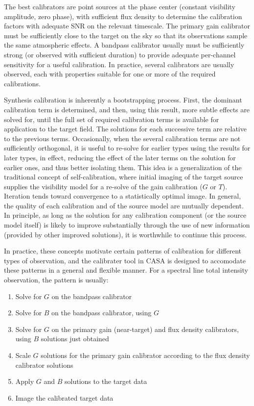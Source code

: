 The best calibrators are point sources at the phase center (constant
visibility amplitude, zero phase), with sufficient flux density to
determine the calibration factors with adequate SNR on the relevant
timescale. The primary gain calibrator must be sufficiently close to
the target on the sky so that its observations sample the same
atmospheric effects. A bandpass calibrator usually must be
sufficiently strong (or observed with sufficient duration) to provide
adequate per-channel sensitivity for a useful calibration. In
practice, several calibrators are usually observed, each with
properties suitable for one or more of the required calibrations. 

Synthesis calibration is inherently a bootstrapping process. First,
the dominant calibration term is determined, and then, using this
result, more subtle effects are solved for, until the full set of
required calibration terms is available for application to the target
field. The solutions for each successive term are relative to the
previous terms. Occasionally, when the several calibration terms are
not sufficiently orthogonal, it is useful to re-solve for earlier
types using the results for later types, in effect, reducing the
effect of the later terms on the solution for earlier ones, and thus
better isolating them. This idea is a generalization of the
traditional concept of self-calibration, where initial imaging of the
target source supplies the visibility model for a re-solve of the gain
calibration ($G$ or $T$). Iteration tends toward convergence to a
statistically optimal image. In general, the quality of each
calibration and of the source model are mutually dependent. In
principle, as long as the solution for any calibration component (or
the source model itself) is likely to improve substantially through
the use of new information (provided by other improved solutions), it
is worthwhile to continue this process. 

In practice, these concepts motivate certain patterns of calibration
for different types of observation, and the calibrater tool in CASA is
designed to accomodate these patterns in a general and flexible
manner. For a spectral line total intensity observation, the pattern
is usually: 

\begin{enumerate}
   \item Solve for $G$ on the bandpass calibrator
   \item Solve for $B$ on the bandpass calibrator, using $G$
   \item Solve for $G$ on the primary gain (near-target) and flux
      density calibrators, using $B$ solutions just obtained 
   \item Scale $G$ solutions for the primary gain calibrator according to
      the flux density calibrator solutions 
   \item Apply $G$ and $B$ solutions to the target data
   \item Image the calibrated target data 
\end{enumerate}

